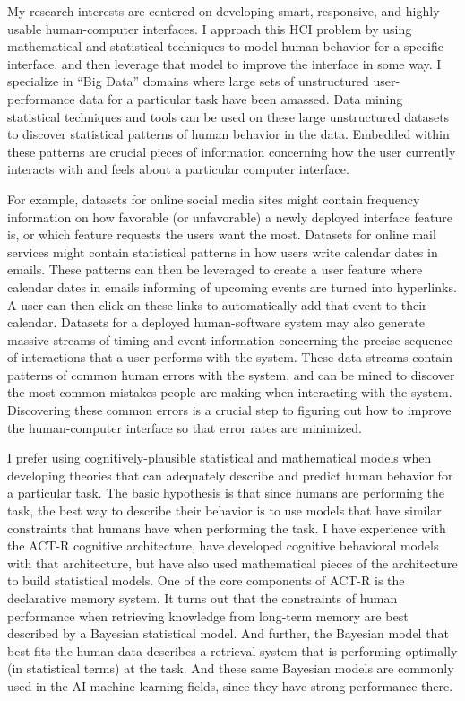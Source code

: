 My research interests are centered on developing smart, responsive, and highly usable human-computer interfaces.
I approach this HCI problem by using mathematical and statistical techniques to model human behavior for a specific interface, and then leverage that model to improve the interface in some way.
I specialize in ``Big Data'' domains where large sets of unstructured user-performance data for a particular task have been amassed.
Data mining statistical techniques and tools can be used on these large unstructured datasets to discover statistical patterns of human behavior in the data.
Embedded within these patterns are crucial pieces of information concerning how the user currently interacts with and feels about a particular computer interface.

For example, datasets for online social media sites might contain frequency information on how favorable (or unfavorable) a newly deployed interface feature is,
or which feature requests the users want the most.
Datasets for online mail services might contain statistical patterns in how users write calendar dates in emails.
These patterns can then be leveraged to create a user feature where calendar dates in emails informing of upcoming events are turned into hyperlinks.
A user can then click on these links to automatically add that event to their calendar.
Datasets for a deployed human-software system may also generate massive streams of timing and event information concerning the precise sequence of interactions that a user performs with the system.
These data streams contain patterns of common human errors with the system, and can be mined to discover the most common mistakes people are making when interacting with the system.
Discovering these common errors is a crucial step to figuring out how to improve the human-computer interface so that error rates are minimized.

I prefer using cognitively-plausible statistical and mathematical models when developing theories that can adequately describe and predict human behavior for a particular task.
The basic hypothesis is that since humans are performing the task, the best way to describe their behavior is to use models that have similar constraints that humans have when performing the task.
I have experience with the ACT-R cognitive architecture, have developed cognitive behavioral models with that architecture,
but have also used mathematical pieces of the architecture to build statistical models.
One of the core components of ACT-R is the declarative memory system.
It turns out that the constraints of human performance when retrieving knowledge from long-term memory are best described by a Bayesian statistical model.
And further, the Bayesian model that best fits the human data describes a retrieval system that is performing optimally (in statistical terms) at the task.
And these same Bayesian models are commonly used in the AI machine-learning fields, since they have strong performance there.

